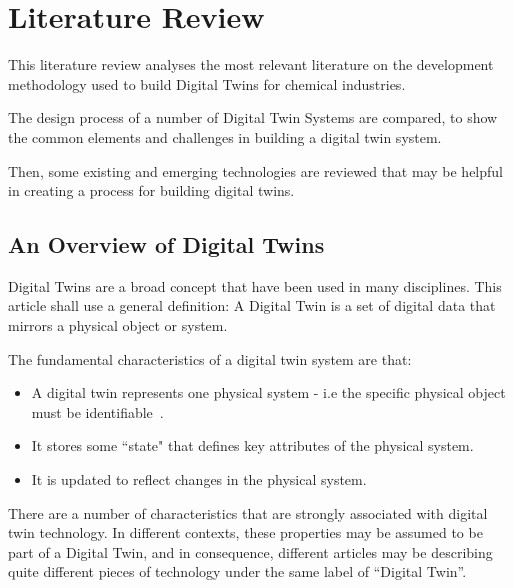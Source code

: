 
\chapter{Literature Review}

This literature review analyses the most relevant literature on the development methodology used to build Digital Twins for chemical industries.

The design process of a number of Digital Twin Systems are compared, to show the common elements and challenges in building a digital twin system.

Then, some existing and emerging technologies are reviewed that may be helpful in creating a process for building digital twins.

\section{An Overview of Digital Twins}

Digital Twins are a broad concept that have been used in many disciplines. This article shall use a general definition: A Digital Twin is a set of digital data that mirrors a physical object or system. 

The fundamental characteristics of a digital twin system are that:

\begin{itemize}
    \item A digital twin represents one physical system - i.e the specific physical object must be identifiable~\cite{minerva_digital_2020}.
    \item It stores some ``state" that defines key attributes of the physical system.
    \item It is updated to reflect changes in the physical system.
\end{itemize}

There are a number of characteristics that are strongly associated with digital twin technology. In different contexts, these properties may be assumed to be part of a Digital Twin, and in consequence, different articles may be describing quite different pieces of technology under the same label of ``Digital Twin''.

